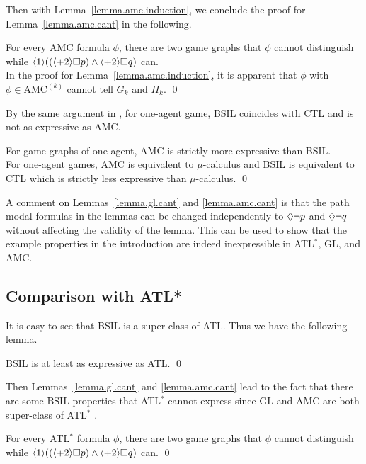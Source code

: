 Then with Lemma~\ref{lemma.amc.induction}, 
we conclude the proof for Lemma~\ref{lemma.amc.cant} in the following. 


{\lemma \label{lemma.amc.cant}
For every AMC formula $\phi$,
there are two game graphs that
$\phi$ cannot distinguish while
$\langle 1\rangle ((\langle+ 2\rangle\Box p)
    \wedge \langle+ 2\rangle\Box q)$ can.
}
\\\pf 
In the proof for Lemma~\ref{lemma.amc.induction}, 
it is apparent that $\phi$ with $\phi\in\mbox{AMC}^{(k)}$ cannot 
tell $G_k$ and $H_k$.  
\qed 

By the same argument in \cite{AHK02}, 
for one-agent game, BSIL coincides with CTL and is not as expressive as 
AMC. 

{\lemma \label{lemma.amc.can}
For game graphs of one agent,
AMC is strictly more expressive than BSIL.} 
\\\pf 
For one-agent games, 
AMC is equivalent to $\mu$-calculus and BSIL is equivalent to CTL which
is strictly less expressive than $\mu$-calculus.
\qed 



A comment on Lemmas~\ref{lemma.gl.cant} and \ref{lemma.amc.cant} 
is that the path modal formulas in the lemmas can be changed 
independently to $\Diamond \neg p$ and $\Diamond \neg q$ without affecting the validity of 
the lemma.  
This can be used to show that the example properties in the introduction 
are indeed inexpressible in ATL$^*$, GL, and AMC.  

\subsection{Comparison with ATL*}
It is easy to see that BSIL is a super-class of ATL.
Thus we have the following lemma.

{\lemma \label{lemma.atl.less}
BSIL is at least as expressive as ATL.  
}
\qed

Then Lemmas~\ref{lemma.gl.cant} and \ref{lemma.amc.cant} 
lead to the 
fact that there are some BSIL properties that 
ATL$^*$ cannot express 
since GL and AMC are both super-class of ATL$^*$ \cite{AHK02}.  



{\lemma \label{lemma.atl.cant} 
For every ATL$^*$ formula $\phi$, 
there are two game graphs that
$\phi$ cannot distinguish while
$\langle 1\rangle ((\langle+ 2\rangle\Box p)
    \wedge \langle+ 2\rangle\Box q)$ can.
}\qed 

